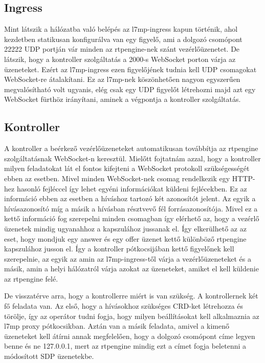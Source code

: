 \subsection{Ingress}

Mint látszik a hálózatba való belépés az l7mp-ingress kapun történik, ahol kezdetben
statikusan konfigurálva van egy figyelő, ami a dolgozó csomópont 22222 UDP portján
vár minden az rtpengine-nek szánt vezérlőüzenetet. De látszik, hogy a kontroller szolgáltatás
a 2000-s WebSocket porton várja az üzeneteket. Ezért az l7mp-ingress ezen figyelőjének 
tudnia kell UDP csomagokat WebSocket-re átalakítani. Ez az l7mp-nek köszönhetően nagyon
egyszerűen megvalósítható volt ugyanis, elég csak egy UDP figyelőt létrehozni majd azt 
egy WebSocket fürthöz irányítani, aminek a végpontja a kontroller szolgáltatás. 


\subsection{Kontroller}
A kontroller a beérkező vezérlőüzeneteket automatikusan továbbítja az rtpengine 
szolgáltatásnak WebSocket-n keresztül. Mielőtt fojtatnám azzal, hogy a kontroller milyen 
feladatokat lát el fontos kifejteni a WebSocket protokoll szükségességét ebben az esetben.
Mivel minden WebSocket-nek  csomag rendelkezik egy HTTP-hez hasonló fejléccel így
lehet egyéni információkat küldeni fejlécekben. Ez az információ ebben az esetben a híváshoz
tartozó  két azonosítót jelent. Az egyik a hívásazonosító míg a másik a hívásban résztvevő
fél forrásazonosítója. Mivel ez a kettő információ fog szerepelni minden csomagban így elérhető az,
hogy a vezérlő üzenetek mindig ugyanahhoz a kapszulához jussanak el. Így elkerülhető az
az eset, hogy mondjuk egy answer és egy offer üzenet kettő különböző rtpengine kapszulához
jusson el. Így a kontroller pótkocsijában kettő figyelőnek kell szerepelnie, az egyik
az amin az l7mp-ingress-től várja a vezérlőüzeneteket és a másik, amin a helyi hálózatról
várja azokat az üzeneteket, amiket el kell küldenie az rtpengine felé. 

De visszatérve arra, hogy a kontrollerre miért is van szükség. A kontrollernek két fő feladata
van. Az első, hogy a hívásokhoz szükséges CRD-ket létrehozza és törölje, így az operátor tudni fogja,
hogy milyen beállításokat kell alkalmaznia az l7mp proxy pótkocsikban. Aztán van a másik feladata,
amivel a kimenő üzeneteket kell átírni annak megfelelően, hogy a dolgozó csomópont
címe legyen benne és ne 127.0.0.1, mert az rtpengine mindig ezt a címet fogja beletenni
a módosított SDP üzenetekbe. 

